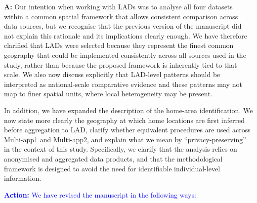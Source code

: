 \documentclass[
  letterpaper,
  DIV=11,
  numbers=noendperiod]{scrartcl}
\begin{document}
\setlength{\leftskip}{0.5cm}\textbf{A:} Our intention when working with
LADs was to analyse all four datasets within a common spatial framework
that allows consistent comparison across data sources, but we recognise
that the previous version of the manuscript did not explain this
rationale and its implications clearly enough. We have therefore
clarified that LADs were selected because they represent the finest
common geography that could be implemented consistently across all
sources used in the study, rather than because the proposed framework is
inherently tied to that scale. We also now discuss explicitly that
LAD-level patterns should be interpreted as national-scale comparative
evidence and these patterns may not map to finer spatial units, where
local heterogeneity may be present.

In addition, we have expanded the description of the home-area
identification. We now state more clearly the geography at which home
locations are first inferred before aggregation to LAD, clarify whether
equivalent procedures are used across Multi-app1 and Multi-app2, and
explain what we mean by ``privacy-preserving'' in the context of this
study. Specifically, we clarify that the analysis relies on anonymised
and aggregated data products, and that the methodological framework is
designed to avoid the need for identifiable individual-level
information.

\setlength{\leftskip}{0.5cm}\textcolor{blue}{\textbf{Action:} We have revised the manuscript in the following ways:}
\end{document}
